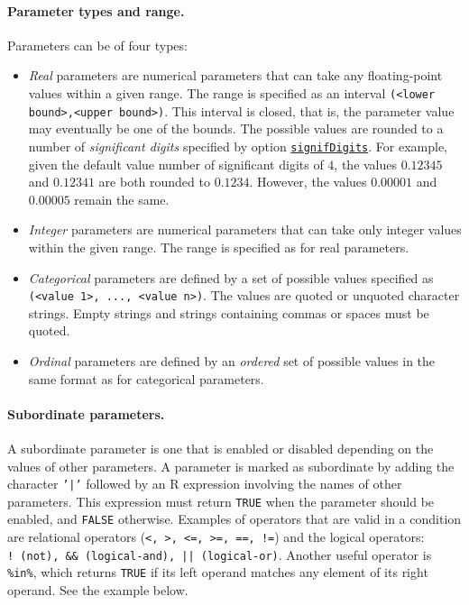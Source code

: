 \documentclass[a4paper]{article}
\newcommand{\aR}{\textsf{R}\xspace}
\newcommand{\parameter}[1]{\hyperlink{opt:#1}{\texttt{#1}}}
\begin{document}
\paragraph{Parameter types and range.}
Parameters can be of four types:
%
\begin{itemize}
\item \textit{Real} parameters are numerical parameters that can take
  any floating-point values within a given range. The range is
  specified as an interval \texttt{(<lower bound>,<upper
    bound>)}. This interval is closed, that is, the parameter value
  may eventually be one of the bounds. The possible values are rounded
  to a number of \emph{significant digits} specified by
  option \parameter{signifDigits}. For example, given the default
  value number of significant digits of $4$, the values $0.12345$ and
  $0.12341$ are both rounded to $0.1234$. However, the values
  $0.00001$ and $0.00005$ remain the same.

\item \textit{Integer} parameters are numerical parameters that can
  take only integer values within the given range. The range is
  specified as for real parameters.

\item \textit{Categorical} parameters are defined by a set of possible
  values specified as \texttt{(<value 1>, ..., <value n>)}. The values
  are quoted or unquoted character strings. Empty strings and strings
  containing commas or spaces must be quoted.

\item \emph{Ordinal} parameters are defined by an \emph{ordered} set
  of possible values in the same format as for categorical parameters.

\end{itemize}


\paragraph{Subordinate parameters.} 
A subordinate parameter is one that is enabled or disabled depending
on the values of other parameters. A parameter is marked as
subordinate by adding the character \texttt{'|'} followed by an \aR
expression involving the names of other parameters. This expression
must return \texttt{TRUE} when the parameter should be enabled, and
\texttt{FALSE} otherwise. Examples of operators that are valid in a condition are relational operators 
(\texttt{<, >, <=, >=, ==, !=}) and the logical operators: \texttt{!~\textrm{(not)}, \&\&~\textrm{(logical-and)},
  ||~\textrm{(logical-or)}}. Another useful operator is
\texttt{\%in\%}, which returns \texttt{TRUE} if its left operand matches any
element of its right operand. See the example below.
\end{document}
